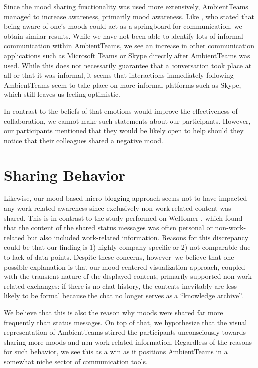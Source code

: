 Since the mood sharing functionality was used more extensively, AmbientTeams managed to increase awareness, primarily mood awareness. Like \textcite{church2010study}, who stated that being aware of one's moods could act as a springboard for communication, we obtain similar results. While we have not been able to identify lots of informal communication within AmbientTeams, we see an increase in other communication applications such as Microsoft Teams or Skype directly after AmbientTeams was used. While this does not necessarily guarantee that a conversation took place at all or that it was informal, it seems that interactions immediately following AmbientTeams seem to take place on more informal platforms such as Skype, which still leaves us feeling optimistic. 

In contrast to the beliefs of \textcite{garcia1999emotional} that emotions would improve the effectiveness of collaboration, we cannot make such statements about our participants. However, our participants mentioned that they would be likely open to help should they notice that their colleagues shared a negative mood. 

\section{Sharing Behavior}
Likewise, our mood-based micro-blogging approach seems not to have impacted any work-related awareness since exclusively non-work-related content was shared. This is in contrast to the study performed on WeHomer \autocite{dullemond2013fixing}, which found that the content of the shared status messages was often personal or non-work-related but also included work-related information. Reasons for this discrepancy could be that our finding is 1) highly company-specific or 2) not comparable due to lack of data points. Despite these concerns, however, we believe that one possible explanation is that our mood-centered visualization approach, coupled with the transient nature of the displayed content, primarily supported non-work-related exchanges: if there is no chat history, the contents inevitably are less likely to be formal because the chat no longer serves as a \enquote{knowledge archive}.

We believe that this is also the reason why moods were shared far more frequently than status messages. On top of that, we hypothesize that the visual representation of AmbientTeams stirred the participants unconsciously towards sharing more moods and non-work-related information. Regardless of the reasons for such behavior, we see this as a win as it positions AmbientTeams in a somewhat niche sector of communication tools.

